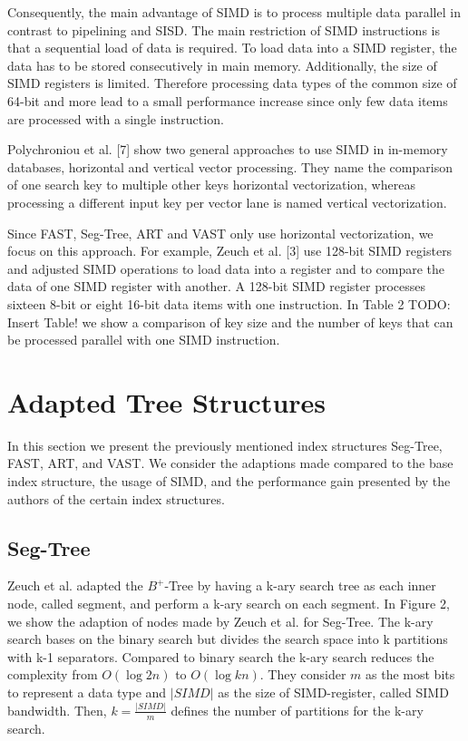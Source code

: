\documentclass[conference]{IEEEtran}
\begin{document}
Consequently, the main advantage of SIMD is to process multiple data parallel in contrast to pipelining and SISD. The main restriction of SIMD instructions is that a sequential load of data is required. To load data into a SIMD register, the data has to be stored consecutively in main memory. Additionally, the size of SIMD registers is limited. Therefore processing data types of the common size of 64-bit and more lead to a small performance increase since only few data items are processed with a single instruction.

Polychroniou et al. [7] show two general approaches to use SIMD in in-memory databases, horizontal and vertical vector processing. They name the comparison of one search key to multiple other keys horizontal vectorization, whereas processing a different input key per vector lane is named vertical vectorization.

Since FAST, Seg-Tree, ART and VAST only use horizontal vectorization, we focus on this approach.  For example, Zeuch et al. [3] use 128-bit SIMD registers and adjusted SIMD operations to load data into a register and to compare the data of one SIMD register with another. A 128-bit SIMD register processes sixteen 8-bit or eight 16-bit data items with one instruction. In Table 2 TODO: Insert Table! we show a comparison of key size and the number of keys that can be processed parallel with one SIMD instruction.


\section{Adapted Tree Structures}
In this section we present the previously mentioned index structures Seg-Tree, FAST, ART, and VAST. We consider the adaptions made compared to the base index structure, the usage of SIMD, and the performance gain presented by the authors of the certain index structures.
\subsection{Seg-Tree}\label{SCM}
Zeuch et al. adapted the $B^+$-Tree by having a k-ary search tree as each inner node, called segment, and perform a k-ary search on each segment.  In Figure 2, we show the adaption of nodes made by Zeuch et al. for Seg-Tree. The k-ary search bases on the binary search but divides the search space into k partitions with k-1 separators. Compared to binary search the k-ary search reduces the complexity from $O(\log{2}{n})$ to $O(\log{k}{n})$. They consider $m$ as the most bits to represent a data type and $\vert SIMD \vert$ as the size of SIMD-register, called SIMD bandwidth. Then, $k = \frac{\vert SIMD \vert }{m}$ defines the number of partitions for the k-ary search. 
\end{document}
